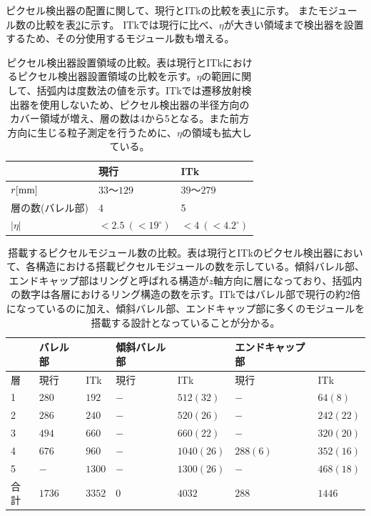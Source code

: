 ピクセル検出器の配置に関して、現行とITkの比較を表\ref{compare_itk_pixel}に示す。
またモジュール数の比較を表\ref{compare_itk_modules}に示す。
ITkでは現行に比べ、$\eta$が大きい領域まで検出器を設置するため、その分使用するモジュール数も増える。

\begin{table}[tbp]
\begin{center}
\caption[ピクセル検出器設置領域の比較]{ピクセル検出器設置領域の比較。表は現行とITkにおけるピクセル検出器設置領域の比較を示す。$\eta$の範囲に関して、括弧内は度数法の値を示す。ITkでは遷移放射検出器を使用しないため、ピクセル検出器の半径方向のカバー領域が増え、層の数は4から5となる。また前方方向に生じる粒子測定を行うために、$\eta$の領域も拡大している。}
\label{compare_itk_pixel}
  \begin{tabular}{|lll|} \hline
    & 現行 & ITk \\ \hline
    $r[\rm{mm}]$ & $33〜129$ & $39〜279$ \\ 
    層の数(バレル部) & 4 & 5 \\ 
    $|\eta|$ & $<2.5~(<19^\circ)$ & $<4~(<4.2^\circ)$ \\ \hline
  \end{tabular}
\end{center}
\end{table}

\begin{table}[tbp]
\begin{center}
\caption[搭載するピクセルモジュール数の比較]{搭載するピクセルモジュール数の比較。表は現行とITkのピクセル検出器において、各構造における搭載ピクセルモジュールの数を示している。傾斜バレル部、エンドキャップ部はリングと呼ばれる構造が$z$軸方向に層になっており、括弧内の数字は各層におけるリング構造の数を示す。ITkではバレル部で現行の約2倍になっているのに加え、傾斜バレル部、エンドキャップ部に多くのモジュールを搭載する設計となっていることが分かる。}
\label{compare_itk_modules}
  \begin{tabular}{|l||ll|ll|ll|} \hline
          & バレル部 &            & 傾斜バレル部 & & エンドキャップ部 & \\ \hline 
    層    & 現行     & ITk        & 現行& ITk          & 現行     & ITk \\ \hline
    1     & $280$    & $192$      & $-$ & $512(32)$        & $-$      & $64(8)$ \\ 
    2     & $286$    & $240$      & $-$ & $520(26)$        & $-$      & $242(22)$ \\ 
    3     & $494$    & $660$      & $-$ & $660(22)$        & $-$      & $320(20)$ \\ 
    4     & $676$    & $960$      & $-$ & $1040(26)$       & $288(6)$ & $352(16)$ \\ 
    5     & $-$      & $1300$     & $-$ & $1300(26)$       & $-$      & $468(18)$ \\ \hline
    合計  & $1736$   & $3352$     & $0$ & $4032$       & $288$    & $1446$ \\ \hline\hline
  \end{tabular}
\end{center}
\end{table}

